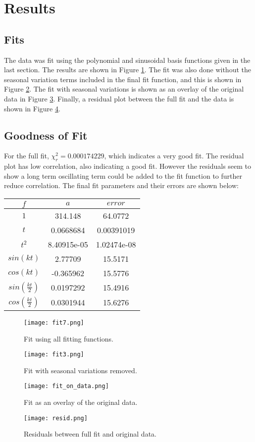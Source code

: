 \documentclass[12pt]{article}
\begin{document}
\section{Results}
\subsection{Fits}
The data was fit using the polynomial and sinusoidal basis functions given in the last section. The results are shown in Figure \ref{f2}. The fit was also done without the seasonal variation terms included in the final fit function, and this is shown in Figure \ref{f3}. The fit with seasonal variations is shown as an overlay of the original data in Figure \ref{f4}. Finally, a residual plot between the full fit and the data is shown in Figure \ref{f5}.
\subsection{Goodness of Fit}
For the full fit, $\chi_r^2 = 0.000174229$, which indicates a very good fit. The residual plot has low correlation, also indicating a good fit. However the residuals seem to show a long term oscillating term could be added to the fit function to further reduce correlation. The final fit parameters and their errors are shown below:
\begin{center}
\begin{tabular}{ c | c | c }
$f$ & $a$ & $error$ \\ \hline
$1$ & 314.148 & 64.0772 \\
$t $ & 0.0668684 & 0.00391019 \\
$t^2$ & 8.40915e-05 & 1.02474e-08 \\
$sin(kt)$ & 2.77709 & 15.5171 \\
$cos(kt)$ & -0.365962 & 15.5776 \\
$sin(\frac{kt}{2})$ & 0.0197292 & 15.4916 \\
$cos(\frac{kt}{2})$ & 0.0301944 & 15.6276 \\
\end{tabular}
\end{center}
\begin{figure}
  \centering
  \texttt{[image: fit7.png]}
  \caption{Fit using all fitting functions.}
  \label{f2}
\end{figure}
\begin{figure}
  \centering
  \texttt{[image: fit3.png]}
  \caption{Fit with seasonal variations removed.}
  \label{f3}
\end{figure}
\begin{figure}
  \centering
  \texttt{[image: fit\_on\_data.png]}
  \caption{Fit as an overlay of the original data.}
  \label{f4}
\end{figure}
\begin{figure}
  \centering
  \texttt{[image: resid.png]}
  \caption{Residuals between full fit and original data.}
  \label{f5}
\end{figure}
\end{document}
